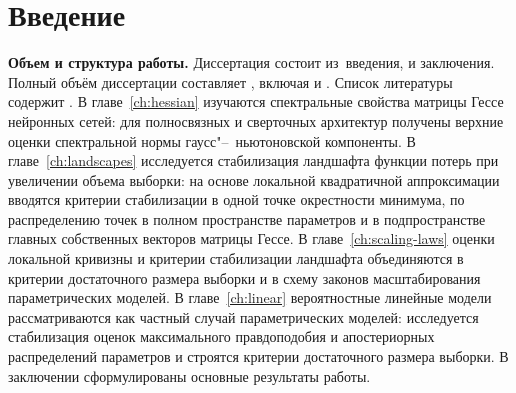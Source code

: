 \chapter*{Введение}                         %

\newcommand{\actuality}{}
\newcommand{\progress}{\textbf{\progressTXT}}
\newcommand{\aim}{{\textbf\aimTXT}}
\newcommand{\tasks}{\textbf{\tasksTXT}}
\newcommand{\object}{{\textbf\objectTXT}}
\newcommand{\subject}{{\textbf\subjectTXT}}
\newcommand{\novelty}{\textbf{\noveltyTXT}}
\newcommand{\tinfluence}{\textbf{\tinfluenceTXT}}
\newcommand{\pinfluence}{\textbf{\pinfluenceTXT}}
\newcommand{\methods}{\textbf{\methodsTXT}}
\newcommand{\defpositions}{\textbf{\defpositionsTXT}}
\newcommand{\passport}{{\textbf\passportTXT}}
\newcommand{\reliability}{\textbf{\reliabilityTXT}}
\newcommand{\probation}{\textbf{\probationTXT}}
\newcommand{\contribution}{\textbf{\contributionTXT}}
\newcommand{\publications}{\textbf{\publicationsTXT}}


\textbf{Объем и структура работы.} Диссертация состоит из~введения,
 и заключения.
Полный объём диссертации составляет
, включая
 и
.
Список литературы содержит
.
В главе~\ref{ch:hessian} изучаются спектральные свойства матрицы Гессе нейронных сетей: для полносвязных и сверточных архитектур получены верхние оценки спектральной нормы гаусс"--~ньютоновской компоненты. В главе~\ref{ch:landscapes} исследуется стабилизация ландшафта функции потерь при увеличении объема выборки: на основе локальной квадратичной аппроксимации вводятся критерии стабилизации в одной точке окрестности минимума, по распределению точек в полном пространстве параметров и в подпространстве главных собственных векторов матрицы Гессе. В главе~\ref{ch:scaling-laws} оценки локальной кривизны и критерии стабилизации ландшафта объединяются в критерии достаточного размера выборки и в схему законов масштабирования параметрических моделей. В главе~\ref{ch:linear} вероятностные линейные модели рассматриваются как частный случай параметрических моделей: исследуется стабилизация оценок максимального правдоподобия и апостериорных распределений параметров и строятся критерии достаточного размера выборки. В заключении сформулированы основные результаты работы.
